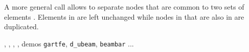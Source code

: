 A more general call allows to separate nodes that are common to two sets of elements . Elements in  are left unchanged while nodes in  that are also in  are duplicated.




\noindent \femk, \fecom, \feplot, , demos {\tt gartfe},  {\tt d\_ubeam}, {\tt beambar} ... 













